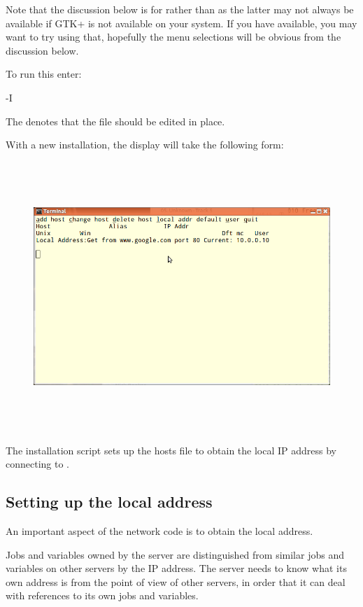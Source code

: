 Note that the discussion below is for \PrHostedit{} rather than \PrXhostedit{} as the latter may not always be available
if GTK+ is not available on your system. If you have \PrXhostedit{} available, you may want to try using that, hopefully the
menu selections will be obvious from the discussion below.

To run this enter:

\begin{expara}

\HosteditName{} -I \hostsfilename

\end{expara}

The  denotes that the file should be edited in place.

With a new installation, the display will take the following form:

\begin{figure}
\centering
\includegraphics[width=16.999cm,height=10.169cm]{img/he1.png}
\end{figure}
The installation script sets up the hosts file to obtain the local IP
address by connecting to .

\subsection{Setting up the local address}
An important aspect of the network code is to obtain the local address.

Jobs and variables owned by the server are distinguished from similar jobs and variables on other
servers by the IP address. The server needs to know what its own address is from the point of view
of other servers, in order that it can deal with references to its own jobs and variables.

